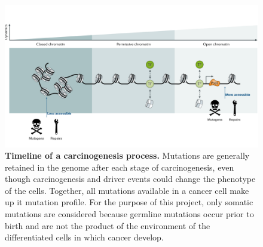 \begin{figure}[h!]
    \centering
    \includegraphics[scale=0.255]{graphics/chromatin_demo.pdf}
    \caption{\textbf{Timeline of a carcinogenesis process.} Mutations are generally retained in the genome after each stage of carcinogenesis, even though carcinogenesis and driver events could change the phenotype of the cells. Together, all mutations available in a cancer cell make up it mutation profile. For the purpose of this project, only somatic mutations are considered because germline mutations occur prior to birth and are not the product of the environment of the differentiated cells in which cancer develop.}
    \label{fig:drivers_demo}
\end{figure}
